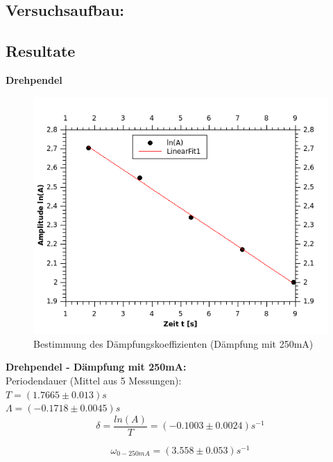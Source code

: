 \documentclass[12pt,a4paper]{article}
\begin{document}
\begin{multicols}{2}
\subsection{Versuchsaufbau:}
\pagebreak
\subsection{Resultate}
\textbf{Drehpendel}

\begin{figure}[H]
	\centering
	\includegraphics[scale=1.6]{./figure/Messung1_Daempfung_omega0.png}
	\caption{Bestimmung des Dämpfungskoeffizienten (Dämpfung mit 250mA)}
	\label{fig:daempfung_omega0_1}
\end{figure}

\noindent \textbf{Drehpendel - Dämpfung mit 250mA:}\\
Periodendauer (Mittel aus 5 Messungen):\\
$T = (1.7665 \pm 0.013)s$\\
$\Lambda = (-0.1718 \pm 0.0045)s$
$$\delta = \frac{ln(A)}{T} = (-0.1003 \pm 0.0024)s^{-1}$$

$$\omega_{0 - 250mA}=(3.558 \pm 0.053)s^{-1}$$




\end{multicols}
\end{document}
